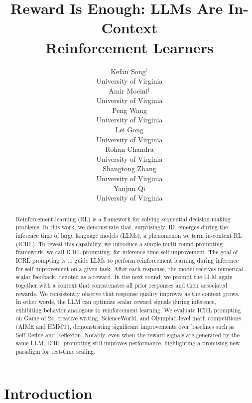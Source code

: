 \documentclass{article} %
\title{Reward Is Enough: LLMs Are In-Context \\ Reinforcement Learners}
\author{%
Kefan Song$^{\dagger}$ \\
University of Virginia \\
\And
Amir Moeini$^{\dagger}$ \\
University of Virginia \\
\And
Peng Wang \\
University of Virginia \\
\And Lei Gong \\
University of Virginia \\
\And Rohan Chandra \\
University of Virginia \\
\And Shangtong Zhang \\
University of Virginia \\
\And Yanjun Qi \\
University of Virginia \\
}
\newcommand{\am}[1]{({\color{magenta}Amir: #1})}
\newcommand{\sz}[1]{({\color{red} {Shangtong: #1}})}
\newcommand{\0}{\mathbf{0}}
\begin{document}
\maketitle

\renewcommand{\thefootnote}{\fnsymbol{footnote}}
\renewcommand{\thefootnote}{\arabic{footnote}}

\begin{abstract}
Reinforcement learning (RL) is a framework for solving sequential decision-making problems. In this work, we demonstrate that, surprisingly, RL emerges during the inference time of large language models (LLMs),  a phenomenon we term in-context RL (ICRL). To reveal this capability, we introduce a simple multi-round prompting framework, we call ICRL prompting, for inference-time self-improvement. The goal of ICRL prompting is to guide LLMs to perform reinforcement learning during inference for self-improvement on a given task. 
After each response, the model receives numerical scalar feedback, denoted as a reward. In the next round, we prompt the LLM again together with a context that concatenates all prior responses and their associated rewards. We consistently observe that response quality improves as the context grows. In other words, the LLM can optimize scalar reward signals during inference, exhibiting behavior analogous to reinforcement learning.
 We evaluate ICRL prompting on Game of 24, creative writing, ScienceWorld, and Olympiad-level math competitions (AIME and HMMT), demonstrating significant improvements over baselines such as Self-Refine and Reflexion. Notably, even when the reward signals are generated by the same LLM, ICRL prompting still improves performance, highlighting a promising new paradigm for test-time scaling.
\end{abstract}



\section{Introduction}
\end{document}
